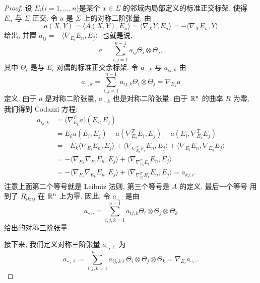 \begin{proof}
设 $E_i$($i=1,\dots,n$)是某个 $x\in\Sigma$ 的邻域内局部定义的标准正交标架,
使得 $E_n$ 与 $\Sigma$ 正交. 令 $a$ 是 $\Sigma$ 上的对称二阶张量, 由
\begin{equation}
a(X,Y)=\langle A(X,Y),E_n\rangle=\langle\nabla_XY,E_n\rangle
 =-\langle\nabla_XE_n,Y\rangle
\label{eq:2.6}
\end{equation}
给出, 并置 $a_{ij}=-\langle\nabla_{E_i}E_n,E_j\rangle$. 也就是说,
\begin{equation}
a=\sum_{i,j=1}^{n-1}a_{ij}\Theta_i\otimes\Theta_j,
\label{eq:2.7}
\end{equation}
其中 $\Theta_i$ 是与 $E_i$ 对偶的标准正交余标架. 令 $a_{\cdot\cdot,k}$ 与
$a_{ij,k}$ 由
\begin{equation}
a_{\cdot\cdot,k}=\sum_{i,j=1}^{n-1}a_{ij,k}\Theta_i\otimes\Theta_j
 =\nabla_{E_k}a
\label{eq:2.8}
\end{equation}
定义. 由于 $a$ 是对称二阶张量, $a_{\cdot\cdot,k}$ 也是对称二阶张量. 由于
$\mathbb{R}^n$ 的曲率 $R$ 为零, 我们得到 Codazzi 方程:
\begin{equation}
\begin{aligned}
a_{ij,k}&=\bigl(\nabla^{T}_{E_k}a\bigr)(E_i,E_j)\\
&=E_ka(E_i,E_j)-a(\nabla^{T}_{E_k}E_i,E_j)-a(E_i,\nabla^{T}_{E_k}E_j)\\
&=-E_k\langle\nabla_{E_i}E_n,E_j\rangle
 +\langle\nabla_{\nabla^{T}_{E_k}E_i}E_n,E_j\rangle
 +\langle\nabla_{E_i}E_n,\nabla_{E_k}E_j\rangle\\
&=-\langle\nabla_{E_k}\nabla_{E_i}E_n,E_j\rangle
 +\langle\nabla_{\nabla^{T}_{E_k}E_i}E_n,E_j\rangle\\
\label{eq:2.9}
&=-\langle\nabla_{E_i}\nabla_{E_k}E_n,E_j\rangle
 +\langle\nabla_{\nabla^{T}_{E_i}E_k}E_n,E_j\rangle=a_{kj,i}.
\end{aligned}
\end{equation}
注意上面第二个等号就是 Leibniz 法则, 第三个等号是 $A$ 的定义, 最后一个等号
用到了 $R_{iknj}$ 在 $\mathbb{R}^n$ 上为零. 因此, 令 $a_{\cdot\cdot,\cdot}$ 是由
\begin{equation}
a_{\cdot\cdot,\cdot}=\sum_{i,j,k=1}^{n-1}a_{ij,k}
 \Theta_i\otimes\Theta_j\otimes\Theta_k
\label{eq:2.10}
\end{equation}
给出的对称三阶张量.

接下来, 我们定义对称三阶张量 $a_{\cdot\cdot,\ell}$ 为
\begin{equation}
a_{\cdot\cdot,\ell}=\sum_{i,j,k=1}^{n-1}a_{ij,k\ell}
 \Theta_i\otimes\Theta_j\otimes\Theta_k
 =\nabla_{E_\ell}a_{\cdot\cdot,\cdot}.
\label{eq:2.11}
\end{equation}


\end{proof}
